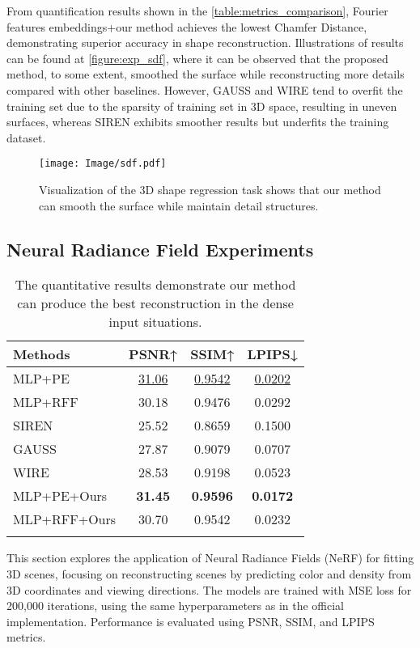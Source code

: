 From quantification results shown in the \autoref{table:metrics_comparison}, Fourier features embeddings+our method achieves the lowest Chamfer Distance, demonstrating superior accuracy in shape reconstruction. Illustrations of results can be found at \autoref{figure:exp_sdf}, where it can be observed that the proposed method, to some extent, smoothed the surface while reconstructing more details compared with other baselines. However, GAUSS and WIRE tend to overfit the training set due to the sparsity of training set in 3D space, resulting in uneven surfaces, whereas SIREN exhibits smoother results but underfits the training dataset.

\begin{figure}[!ht]
    \texttt{[image: Image/sdf.pdf]} %
    \caption{Visualization of the 3D shape regression task shows that our method can smooth the surface while maintain detail structures.}
     \vspace{-10pt}
    \label{figure:exp_sdf}
\end{figure}

\subsection{Neural Radiance Field Experiments}
\begin{table}[!ht]
    \centering
    \caption{The quantitative results demonstrate our method can produce the best reconstruction in the dense input situations.}
    \vspace{10pt}
    \begin{tabular}{lccc}
        \toprule
        Methods & PSNR↑ & SSIM↑ & LPIPS↓ \\
        \midrule
        MLP+PE        & \underline{31.06} & \underline{0.9542} & \underline{0.0202} \\
        MLP+RFF        & 30.18 & 0.9476 & 0.0292 \\
        SIREN         & 25.52 & 0.8659 & 0.1500 \\
        GAUSS         & 27.87 & 0.9079 & 0.0707 \\
        WIRE          & 28.53 & 0.9198 & 0.0523 \\
        MLP+PE+Ours   & \textbf{31.45} & \textbf{0.9596} & \textbf{0.0172} \\
        MLP+RFF+Ours   & 30.70 & 0.9542 & 0.0232\\
        \bottomrule
        \vspace{-25pt}
    \end{tabular}
    \label{tab:nerf200}
    
\end{table}
This section explores the application of Neural Radiance Fields (NeRF) for fitting 3D scenes, focusing on reconstructing scenes by predicting color and density from 3D coordinates and viewing directions. The models are trained with MSE loss for 200,000 iterations, using the same hyperparameters as in the official implementation. Performance is evaluated using PSNR, SSIM, and LPIPS metrics. 

